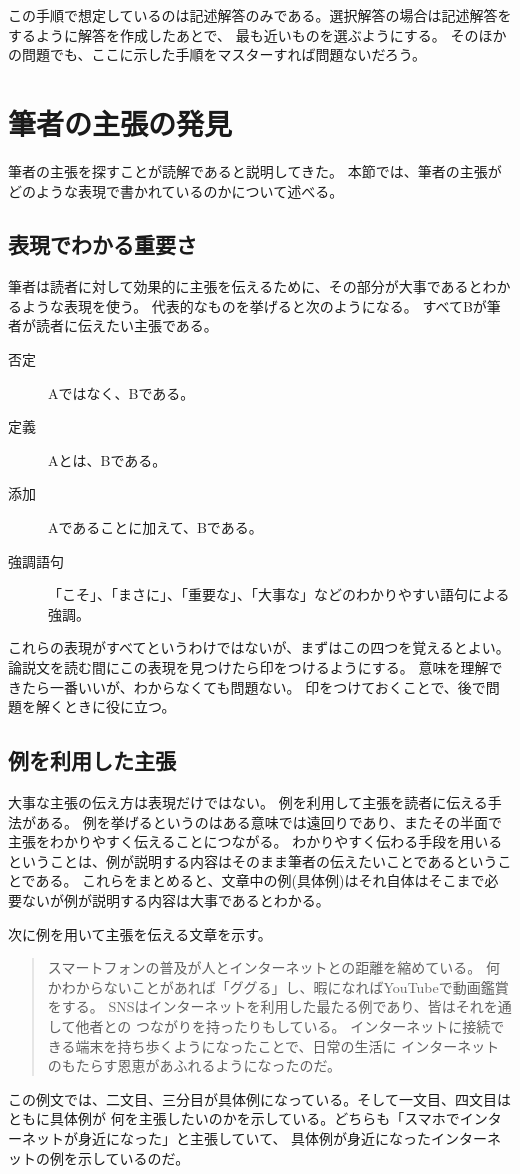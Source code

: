 \documentclass{tarticle}
\begin{document}
	この手順で想定しているのは記述解答のみである。選択解答の場合は記述解答をするように解答を作成したあとで、
	最も近いものを選ぶようにする。
	そのほかの問題でも、ここに示した手順をマスターすれば問題ないだろう。
	
	
	\section{筆者の主張の発見}
    筆者の主張を探すことが読解であると説明してきた。
    本節では、筆者の主張がどのような表現で書かれているのかについて述べる。

	\subsection{表現でわかる重要さ}
	筆者は読者に対して効果的に主張を伝えるために、その部分が大事であるとわかるような表現を使う。
	代表的なものを挙げると次のようになる。
    すべてBが筆者が読者に伝えたい主張である。

	\begin{description}
		\item[否定] Aではなく、Bである。
		\item[定義] Aとは、Bである。
		\item[添加] Aであることに加えて、Bである。
		\item[強調語句] 「こそ」、「まさに」、「重要な」、「大事な」などのわかりやすい語句による強調。
	\end{description}
	これらの表現がすべてというわけではないが、まずはこの四つを覚えるとよい。
    論説文を読む間にこの表現を見つけたら印をつけるようにする。
    意味を理解できたら一番いいが、わからなくても問題ない。
    印をつけておくことで、後で問題を解くときに役に立つ。

	\subsection{例を利用した主張}
    大事な主張の伝え方は表現だけではない。
    例を利用して主張を読者に伝える手法がある。
	例を挙げるというのはある意味では遠回りであり、またその半面で主張をわかりやすく伝えることにつながる。
	わかりやすく伝わる手段を用いるということは、例が説明する内容はそのまま筆者の伝えたいことであるということである。
	これらをまとめると、文章中の例(具体例)はそれ自体はそこまで必要ないが例が説明する内容は大事であるとわかる。

    次に例を用いて主張を伝える文章を示す。
	\begin{quotation}
		スマートフォンの普及が人とインターネットとの距離を縮めている。
		何かわからないことがあれば「ググる」し、暇になればYouTubeで動画鑑賞をする。
		SNSはインターネットを利用した最たる例であり、皆はそれを通して他者との
		つながりを持ったりもしている。
		インターネットに接続できる端末を持ち歩くようになったことで、日常の生活に
		インターネットのもたらす恩恵があふれるようになったのだ。
	\end{quotation}
	この例文では、二文目、三分目が具体例になっている。そして一文目、四文目はともに具体例が
	何を主張したいのかを示している。どちらも「スマホでインターネットが身近になった」と主張していて、
	具体例が身近になったインターネットの例を示しているのだ。
\end{document}
